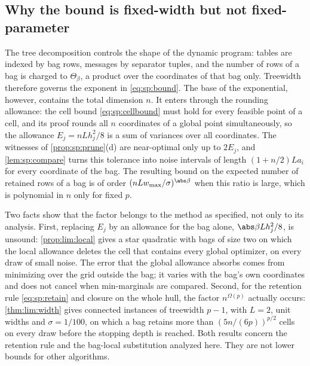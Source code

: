 \subsection{Why the bound is fixed-width but not fixed-parameter}\label{sec:sp:width}

The tree decomposition controls the shape of the dynamic program: tables
are indexed by bag rows, messages by separator tuples, and the number of
rows of a bag is charged to $\Theta_\beta$, a product over the coordinates
of that bag only. Treewidth therefore governs the exponent in
\eqref{eq:sp:bound}. The base of the exponential, however, contains the
total dimension $n$. It enters through the rounding allowance: the cell bound
\eqref{eq:sp:cellbound} must hold for every feasible point of a cell, and
its proof rounds all $n$ coordinates of a global point simultaneously, so
the allowance $E_j=nLh_j^2/8$ is a sum of variances over all coordinates.
The witnesses of \cref{prop:sp:prune}(d) are near-optimal only up to
$2E_j$, and \cref{lem:sp:compare} turns this tolerance into noise intervals
of length $(1+n/2)La_i$ for every coordinate of the bag. The resulting bound
on the expected number of retained rows of a bag is of order
$(nLw_{\max}/\sigma)^{\abs\beta}$ when this ratio is large, which is polynomial
in $n$ only for fixed $p$.

Two facts show that the factor belongs to the method as specified, not
only to its analysis. First, replacing $E_j$ by an allowance for the bag
alone, $\abs\beta Lh_j^2/8$, is unsound: \cref{prop:lim:local} gives a star
quadratic with bags of size two on which the local allowance deletes the
cell that contains every global optimizer, on every draw of small noise. The
error that the global allowance absorbs comes from minimizing over the grid
outside the bag; it varies with the bag's own coordinates and does not
cancel when min-marginals are compared. Second, for the retention rule
\eqref{eq:sp:retain} and closure on the whole hull, the factor
$n^{\Omega(p)}$ actually occurs: \cref{thm:lim:width} gives connected
instances of treewidth $p-1$, with $L=2$, unit widths and $\sigma=1/100$,
on which a bag retains more than $(5n/(6p))^{p/2}$ cells on every draw
before the stopping depth is reached. Both results concern the retention
rule and the bag-local substitution analyzed here. They are not lower
bounds for other algorithms.

